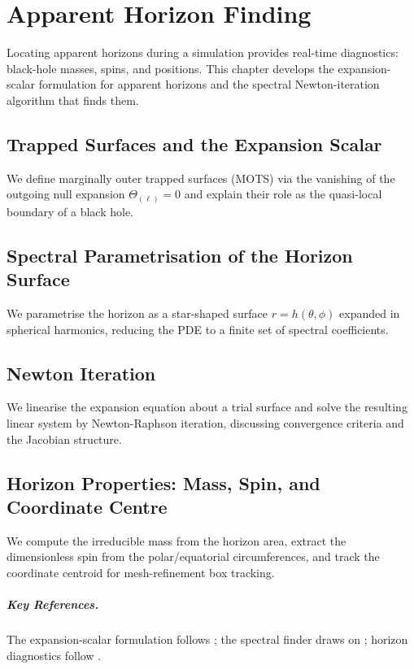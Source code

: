 \chapter{Apparent Horizon Finding}
\label{ch:horizons}

Locating apparent horizons during a simulation provides real-time diagnostics:
black-hole masses, spins, and positions. This chapter develops the
expansion-scalar formulation for apparent horizons and the spectral
Newton-iteration algorithm that finds them.

\section{Trapped Surfaces and the Expansion Scalar}
\label{sec:ah-trapped}

We define marginally outer trapped surfaces (MOTS) via the vanishing of the
outgoing null expansion $\Theta_{(\ell)} = 0$ and explain their role as the
quasi-local boundary of a black hole.

\section{Spectral Parametrisation of the Horizon Surface}
\label{sec:ah-spectral}

We parametrise the horizon as a star-shaped surface $r = h(\theta,\phi)$
expanded in spherical harmonics, reducing the PDE to a finite set of spectral
coefficients.

\section{Newton Iteration}
\label{sec:ah-newton}

We linearise the expansion equation about a trial surface and solve the
resulting linear system by Newton-Raphson iteration, discussing convergence
criteria and the Jacobian structure.

\section{Horizon Properties: Mass, Spin, and Coordinate Centre}
\label{sec:ah-properties}

We compute the irreducible mass from the horizon area, extract the
dimensionless spin from the polar/equatorial circumferences, and track the
coordinate centroid for mesh-refinement box tracking.

\paragraph{Key References.}
The expansion-scalar formulation follows \cite{Thornburg2007}; the spectral
finder draws on \cite{Lin2007}; horizon diagnostics follow
\cite{Dreyer2003,Campanelli2006}.
